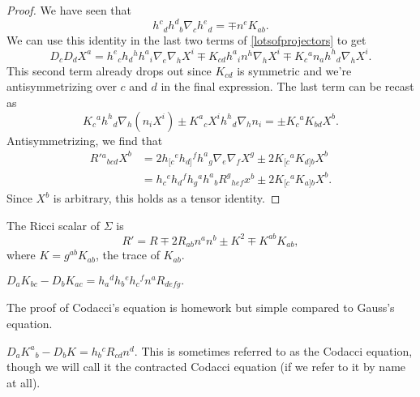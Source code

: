 \begin{proof}
    We have seen that
    \begin{equation}\label{projectorsandcurvature}
        h^c{}_d h^d{}_b \nabla_c h^e{}_d = \mp n^e K_{ab}.
    \end{equation}
    We can use this identity in the last two terms of \ref{lotsofprojectors} to get
    \begin{equation}
        D_c D_d X^a = h^e{}_c h_d{}^h h^a{}_i \nabla_e \nabla_h X^i \mp K_{cd} h^a{}_i n^h \nabla_h X^i \mp K_c{}^a n_a h^h{}_d \nabla_h X^i.
    \end{equation}
    This second term already drops out since $K_{cd}$ is symmetric and we're antisymmetrizing over $c$ and $d$ in the final expression. The last term can be recast as
    \begin{equation}
        K_c{}^a h^h{}_d \nabla_h(n_i X^i)\pm K^a{}_c X^i h^h{}_d \nabla_h n_i = \pm K_c{}^a K_{bd}X^b.
    \end{equation}
    Antisymmetrizing, we find that
    \begin{align*}
        R'{}^a{}_{bcd} X^b &= 2h_{[c}{}^e h_{d]}{}^f h^a{}_g \nabla_e \nabla_f X^g \pm 2 K_{[c}{}^a K_{d]b} X^b\\
        &= h_c{}^e h_d{}^f h_g{}^a h^a{}_b R^g{}_{hef} x^b \pm 2 K_{[c}{}^a K_{a]b}X^b.
    \end{align*}
    Since $X^b$ is arbitrary, this holds as a tensor identity.
\end{proof}
\begin{lem}
    The Ricci scalar of $\Sigma$ is 
    \begin{equation}
        R'=R\mp 2 R_{ab} n^a n^b \pm K^2 \mp K^{ab}K_{ab},
    \end{equation}
    where $K=g^{ab}K_{ab}$, the trace of $K_{ab}$.
\end{lem}
\begin{prop}
    $D_aK_{bc}-D_b K_{ac}=h_a{}^d h_b{}^e h_c{}^f n^a R_{defg}.$
\end{prop}
The proof of Codacci's equation is homework but simple compared to Gauss's equation.
\begin{lem}
    $D_a K^a{}_b-D_b K = h_b{}^c R_{cd} n^d$.
    This is sometimes referred to as the Codacci equation, though we will call it the contracted Codacci equation (if we refer to it by name at all).
\end{lem}


